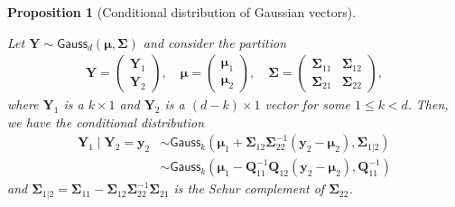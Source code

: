 \documentclass[
  11pt,
  letterpaper,
]{scrbook}
\theoremstyle{definition}
\theoremstyle{plain}
\newtheorem{proposition}{Proposition}[chapter]
\theoremstyle{plain}
\theoremstyle{definition}
\theoremstyle{definition}
\theoremstyle{remark}
\begin{document}
\begin{proposition}[Conditional distribution of Gaussian
vectors]\protect\hypertarget{prp-conditional-gaussian}{}\label{prp-conditional-gaussian}

Let
\(\boldsymbol{Y} \sim \mathsf{Gauss}_d(\boldsymbol{\mu}, \boldsymbol{\Sigma})\)
and consider the partition \begin{align*}
 \boldsymbol{Y} = \begin{pmatrix} \boldsymbol{Y}_1 \\ \boldsymbol{Y}_2\end{pmatrix}, \quad 
 \boldsymbol{\mu} = \begin{pmatrix} \boldsymbol{\mu}_1 \\ \boldsymbol{\mu}_2\end{pmatrix}, \quad 
 \boldsymbol{\Sigma} = \begin{pmatrix} \boldsymbol{\Sigma}_{11} & \boldsymbol{\Sigma}_{12}\\ \boldsymbol{\Sigma}_{21} & \boldsymbol{\Sigma}_{22}\end{pmatrix},
\end{align*} where \(\boldsymbol{Y}_1\) is a \(k \times 1\) and
\(\boldsymbol{Y}_2\) is a \((d-k) \times 1\) vector for some
\(1\leq k < d.\) Then, we have the conditional distribution
\begin{align*}
\boldsymbol{Y}_1 \mid \boldsymbol{Y}_2 =\boldsymbol{y}_2 &\sim \mathsf{Gauss}_k(\boldsymbol{\mu}_1+\boldsymbol{\Sigma}_{12} \boldsymbol{\Sigma}_{22}^{-1}(\boldsymbol{y}_2-\boldsymbol{\mu}_2), \boldsymbol{\Sigma}_{1|2})
\\& \sim  \mathsf{Gauss}_k(\boldsymbol{\mu}_1-\boldsymbol{Q}_{11}^{-1}\boldsymbol{Q}_{12}(\boldsymbol{y}_2-\boldsymbol{\mu}_2), \boldsymbol{Q}^{-1}_{11})
\end{align*} and
\(\boldsymbol{\Sigma}_{1|2}=\boldsymbol{\Sigma}_{11}-\boldsymbol{\Sigma}_{12}\boldsymbol{\Sigma}_{22}^{-1}\boldsymbol{\Sigma}_{21}\)
is the Schur complement of \(\boldsymbol{\Sigma}_{22}\).

\end{proposition}
\end{document}
